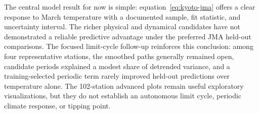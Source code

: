 \documentclass[11pt,a4paper]{article}
\begin{document}
The central model result for now is simple: equation~\ref{eq:kyoto-jma} offers a clear response to March temperature with a documented sample, fit statistic, and uncertainty interval. The richer physical and dynamical candidates have not demonstrated a reliable predictive advantage under the preferred JMA held-out comparisons. The focused limit-cycle follow-up reinforces this conclusion: among four representative stations, the smoothed paths generally remained open, candidate periods explained a modest share of detrended variance, and a training-selected periodic term rarely improved held-out predictions over temperature alone. The 102-station advanced plots remain useful exploratory visualizations, but they do not establish an autonomous limit cycle, periodic climate response, or tipping point.

\end{document}
